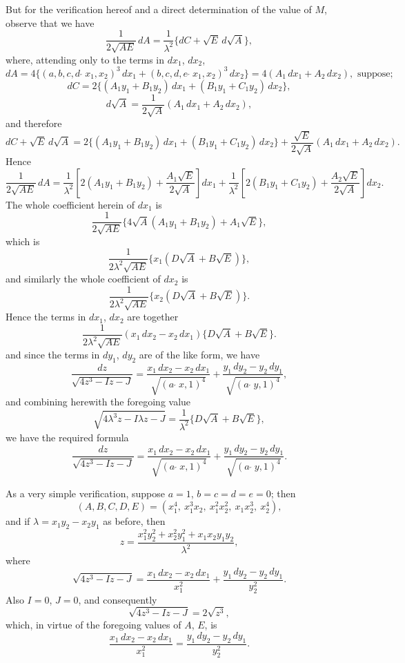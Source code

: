 \documentclass[11pt,a4paper]{book}
\begin{document}
But for the verification hereof and a direct determination of the value of $M$, observe that we have
\[
\frac{1}{2\sqrt{AE}}\,dA = \frac{1}{\lambda^2}\{dC + \sqrt{E}\,d\sqrt{A}\},
\]
where, attending only to the terms in $dx_1$, $dx_2$,
\[
dA = 4\{(a, b, c, d \,\check{\,}\, x_1, x_2)^3\,dx_1 + (b, c, d, e \,\check{\,}\, x_1, x_2)^3\,dx_2\} = 4(A_1\,dx_1 + A_2\,dx_2), \text{ suppose};
\]
\[
dC = 2\{(A_1y_1 + B_1y_2)\,dx_1 + (B_1y_1 + C_1y_2)\,dx_2\},
\]
\[
d\sqrt{A} = \frac{1}{2\sqrt{A}}(A_1\,dx_1 + A_2\,dx_2),
\]
and therefore
\[
dC + \sqrt{E}\,d\sqrt{A} = 2\{(A_1y_1 + B_1y_2)\,dx_1 + (B_1y_1 + C_1y_2)\,dx_2\} + \frac{\sqrt{E}}{2\sqrt{A}}(A_1\,dx_1 + A_2\,dx_2).
\]
Hence
\[
\frac{1}{2\sqrt{AE}}\,dA = \frac{1}{\lambda^2}\left[2(A_1y_1 + B_1y_2) + \frac{A_1\sqrt{E}}{2\sqrt{A}}\right]dx_1 + \frac{1}{\lambda^2}\left[2(B_1y_1 + C_1y_2) + \frac{A_2\sqrt{E}}{2\sqrt{A}}\right]dx_2.
\]
The whole coefficient herein of $dx_1$ is
\[
\frac{1}{2\sqrt{AE}}\{4\sqrt{A}(A_1y_1 + B_1y_2) + A_1\sqrt{E}\},
\]
which is
\[
\frac{1}{2\lambda^2\sqrt{AE}}\{x_1(D\sqrt{A} + B\sqrt{E})\},
\]
and similarly the whole coefficient of $dx_2$ is
\[
\frac{1}{2\lambda^2\sqrt{AE}}\{x_2(D\sqrt{A} + B\sqrt{E})\}.
\]
Hence the terms in $dx_1$, $dx_2$ are together
\[
\frac{1}{2\lambda^2\sqrt{AE}}(x_1\,dx_2 - x_2\,dx_1)\{D\sqrt{A} + B\sqrt{E}\}.
\]
and since the terms in $dy_1$, $dy_2$ are of the like form, we have
\[
\frac{dz}{\sqrt{4z^3 - Iz - J}} = \frac{x_1\,dx_2 - x_2\,dx_1}{\sqrt{(a\,\check{\,}\,x, 1)^4}} + \frac{y_1\,dy_2 - y_2\,dy_1}{\sqrt{(a\,\check{\,}\,y, 1)^4}},
\]
and combining herewith the foregoing value
\[
\sqrt{4\lambda^3z - I\lambda z - J} = \frac{1}{\lambda^2}\{D\sqrt{A} + B\sqrt{E}\},
\]
we have the required formula
\[
\frac{dz}{\sqrt{4z^3 - Iz - J}} = \frac{x_1\,dx_2 - x_2\,dx_1}{\sqrt{(a\,\check{\,}\,x, 1)^4}} + \frac{y_1\,dy_2 - y_2\,dy_1}{\sqrt{(a\,\check{\,}\,y, 1)^4}}.
\]

As a very simple verification, suppose $a = 1$, $b = c = d = e = 0$; then
\[
(A, B, C, D, E) = (x_1^4,\ x_1^3x_2,\ x_1^2x_2^2,\ x_1x_2^3,\ x_2^4),
\]
and if $\lambda = x_1y_2 - x_2y_1$ as before, then
\[
z = \frac{x_1^2y_2^2 + x_2^2y_1^2 + x_1x_2y_1y_2}{\lambda^2},
\]
where
\[
\sqrt{4z^3 - Iz - J} = \frac{x_1\,dx_2 - x_2\,dx_1}{x_1^2} + \frac{y_1\,dy_2 - y_2\,dy_1}{y_2^2}.
\]
Also $I = 0$, $J = 0$, and consequently
\[
\sqrt{4z^3 - Iz - J} = 2\sqrt{z^3},
\]
which, in virtue of the foregoing values of $A$, $E$, is
\[
\frac{x_1\,dx_2 - x_2\,dx_1}{x_1^2} = \frac{y_1\,dy_2 - y_2\,dy_1}{y_2^2}.
\]
\end{document}
